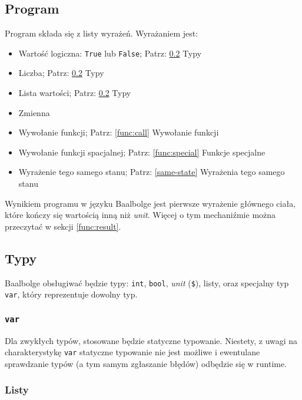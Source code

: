 \documentclass{article}
\begin{document}
\subsection{Program}

Program składa się z listy wyrażeń. Wyrażaniem jest:

\begin{itemize}
    \item Wartość logiczna: \texttt{True} lub \texttt{False}; Patrz: \ref{typy} Typy
    \item Liczba; Patrz: \ref{typy} Typy
    \item Lista wartości; Patrz: \ref{typy} Typy
    \item Zmienna
    \item Wywołanie funkcji; Patrz: \ref{func:call} Wywołanie funkcji
    \item Wywołanie funkcji spacjalnej; Patrz: \ref{func:special} Funkcje specjalne
    \item Wyrażenie tego samego stanu; Patrz: \ref{same-state} Wyrażenia tego samego stanu
\end{itemize}

Wynikiem programu w języku Baalbolge jest pierwsze wyrażenie głównego ciała, które kończy się wartością inną niż \textit{unit}. Więcej o tym mechaniźmie można przeczytać w sekcji \ref{func:result}.

\subsection{Typy}\label{typy}

Baalbolge obsługiwać będzie typy: \texttt{int}, \texttt{bool}, \textit{unit} (\texttt{\$}), listy, oraz specjalny typ \texttt{var}, który reprezentuje dowolny typ.

\subsubsection{\texttt{var}}\label{type:var}

Dla zwykłych typów, stosowane będzie statyczne typowanie. Niestety, z uwagi na charakterystykę \texttt{var} statyczne typowanie nie jest możliwe i ewentulane sprawdzanie typów (a tym samym zgłaszanie błędów) odbędzie się w runtime.

\subsubsection{Listy}
\end{document}
